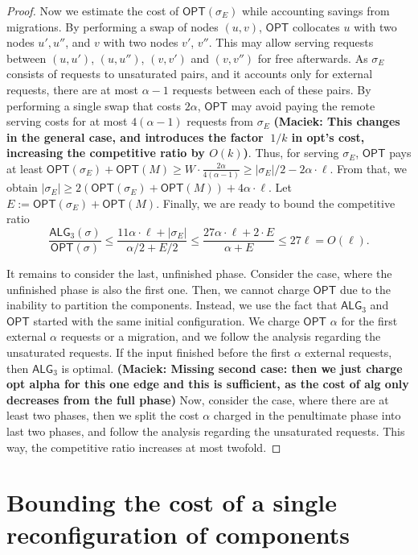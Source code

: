 \documentclass[manuscript,screen=true, review, anonymous]{acmart}
\newcommand{\OPT}{\textsf{OPT}\xspace}
\newcommand{\TAlg}{{\ensuremath{\textsf{ALG}_{3}}}\xspace}
\newcommand\maciek[1]{\color{brown}\textbf{(Maciek: #1)}\color{black}}
\begin{document}
\begin{proof}
	
	Now we estimate the cost of $\OPT(\sigma_E)$ while accounting savings from migrations.
	By performing a swap of nodes $(u,v)$, $\OPT$ collocates $u$ with two nodes $u', u''$, and $v$ with two nodes $v'$, $v''$.
	This may allow serving requests between $(u,u')$, $(u,u'')$, $(v,v')$ and $(v,v'')$ for free afterwards.
	As $\sigma_E$ consists of requests to unsaturated pairs, and it accounts only for external requests, there are at most $\alpha-1$ requests between each of these pairs.
	By performing a single swap that costs $2\alpha$, $\OPT$ may avoid paying the remote serving costs for at most $4 (\alpha - 1)$ requests from $\sigma_E$
	\maciek{This changes in the general case, and introduces the factor $~1/k$ in opt's cost, increasing the competitive ratio by $O(k)$}.
	Thus, for serving $\sigma_E$, $\OPT$ pays at least $\OPT(\sigma_E) + \OPT(M) \geq W \cdot \frac{2\alpha}{4 (\alpha-1)}\geq |\sigma_E| / 2 - 2 \alpha \cdot \ell$.
	From that, we obtain $|\sigma_E| \geq 2(\OPT(\sigma_E)+\OPT(M)) + 4\alpha \cdot \ell$.
	Let $E := \OPT(\sigma_E) + \OPT(M)$. Finally, we are ready to bound the competitive ratio
	\begin{equation*}
		\frac{\TAlg(\sigma)}{\OPT(\sigma)} \leq \frac{11\alpha \cdot \ell + |\sigma_E|}{\alpha/2 + E/2} \leq \frac{27\alpha\cdot\ell + 2\cdot E}{\alpha + E} \leq 27 \ell = O(\ell).
	\end{equation*}
	
	\medskip
	
	It remains to consider the last, unfinished phase.
	Consider the case, where the unfinished phase is also the first one.
	Then, we cannot charge $\OPT$ due to the inability to partition the components.
	Instead, we use the fact that \TAlg and $\OPT$ started with the same initial configuration.
	We charge $\OPT$ $\alpha$ for the first external $\alpha$ requests or a migration,
	and we follow the analysis regarding the unsaturated requests.
	If the input finished before the first $\alpha$ external requests, then \TAlg is optimal.
	\maciek{Missing second case: then we just charge opt alpha for this one edge and this is sufficient, as the cost of alg only decreases from the full phase}
	Now, consider the case, where there are at least two phases, then we split the cost $\alpha$ charged in the penultimate phase into last two phases, and follow the analysis regarding the unsaturated requests.
	This way, the competitive ratio increases at most twofold.
\end{proof}


\section{Bounding the cost of a single reconfiguration of components}
\end{document}
